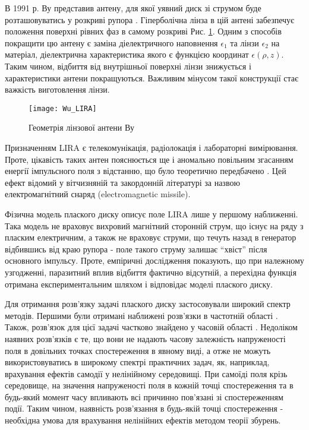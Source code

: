 В 1991 р. Ву представив антену, для якої уявний диск зі струмом буде 
розташовуватись у розкриві рупора \cite{imp:Wu1991}. Гіперболічна лінза в 
цій антені забезпечує положення поверхні рівних фаз в самому розкриві 
Рис. \ref{fig:lira_wu}. Одним з способів покращити цю антену є 
заміна діелектричного наповнення $ \epsilon_1 $ та лінзи $ \epsilon_2 $ на 
матеріал, діелектрична характеристика якого є функцією координат 
$ \epsilon(\rho, z) $. Таким чином, відбиття від внутрішньої поверхні лінзи 
знижується і характеристики антени покращуються. Важливим мінусом такої 
конструкції стає важкість виготовлення лінзи.

\begin{figure}[htbp] \begin{center}
\texttt{[image: Wu\_LIRA]}
\caption{Геометрія лінзової антени Ву} \label{fig:lira_wu}
\end{center} \end{figure}

\vspace{8mm}
Призначенням LIRA є телекомунікація, радіолокація і лабораторні вимірювання. 
Проте, цікавість таких антен пояснюється ще і аномально повільним згасанням 
енергії імпульсного поля з відстанню, що було теоретично передбачено 
\cite{imp:Wu1987}. Цей ефект відомий у вітчизняній та закордонній літературі 
за назвою електромагнітний снаряд (electromagnetic missile).

Фізична модель плаского диску описує поле LIRA лише у першому наближенні.
Така модель не враховує вихровий магнітний сторонній струм, що існує на ряду 
з пласким електричним, а також не враховує струми, що течуть назад в 
генератор відбившись від краю рупора - поле такого струму залишає ``хвіст'' 
після основного імпульсу. Проте, емпіричні дослідження 
\cite{imp:BaumSSN0396,imp:BaumSSN0401} показують, що при належному 
узгодженні, паразитний вплив відбиття фактично відсутній, а перехідна 
функція отримана експериментальним шляхом і відповідає моделі плаского диску.

Для отримання розв'язку задачі плаского диску застосовували широкий спектр 
методів. Першими були отримані наближені розв'язки в частотній області 
\cite{imp:Wu1985,imp:Sodin1992-10}. Також, розв'язок для цієї задачі частково
знайдено у часовій області \cite{imp:Dumin1996}. Недоліком наявних розв'язків 
є те, що вони не надають часову залежність напруженості поля в довільних точках 
спостереження в явному виді, а отже не можуть використовуватись в широкому 
спектрі практичних задач, як, наприклад, врахування ефектів самодії у 
нелінійному середовищі. При самоїді поля крізь середовище, на значення 
напруженості поля в кожній точці спостереження та в будь-який момент часу 
впливають всі причинно пов'язані зі спостереженням події. Таким чином, 
наявність розв'язання в будь-якій точці спостереження - необхідна умова для 
врахування нелінійних ефектів методом теорії збурень.

